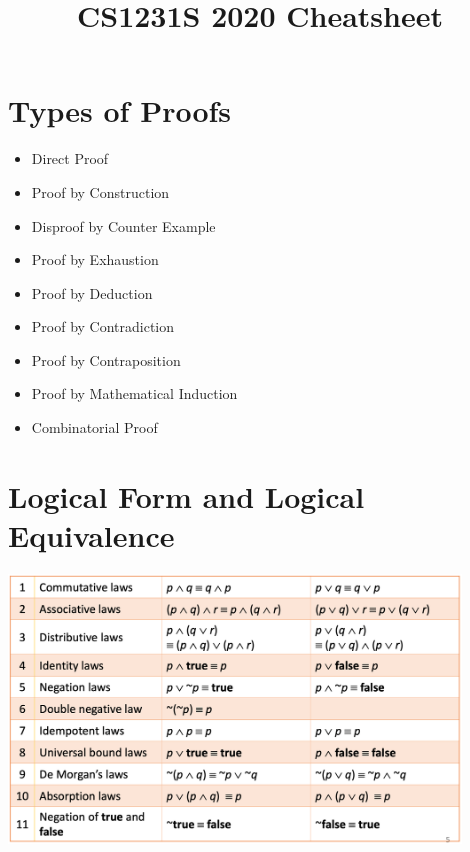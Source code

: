 \documentclass{article}
\title{CS1231S 2020 Cheatsheet}
\date{}
\begin{document}

\section*{Types of Proofs}
\begin{multicols}{2}
\begin{itemize}
    \item Direct Proof
    \item Proof by Construction
    \item Disproof by Counter Example
    \item Proof by Exhaustion
    \item Proof by Deduction
    \item Proof by Contradiction
    \item Proof by Contraposition
    \item Proof by Mathematical Induction
    \item Combinatorial Proof
\end{itemize}
\end{multicols}

\section*{Logical Form and Logical Equivalence}
\begin{center}
    \includegraphics[width=12cm]{images/theorem2.1.1.png}
\end{center}
\end{document}
